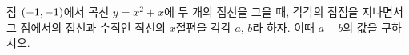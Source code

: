 점 $(-1{,}\mkern3mu\mathopen{}-1)$에서 곡선 $y=x^2+x$에 두 개의 접선을 그을 때, 각각의 접점을 지나면서 그 점에서의 접선과 수직인 직선의 $x$절편을 각각 $a$, $b$라 하자. 이때 $a+b$의 값을 구하시오.
